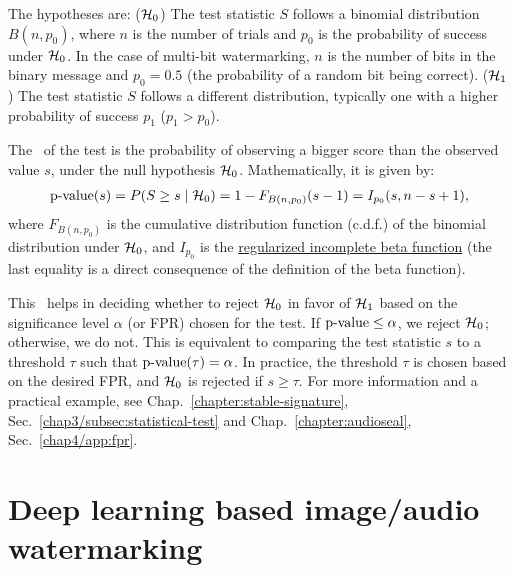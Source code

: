 The hypotheses are:
($\mathcal{H}_0$) The test statistic $S$ follows a binomial distribution $B(n, p_0)$, where $n$ is the number of trials and $p_0$ is the probability of success under $\mathcal{H}_0$.
In the case of multi-bit watermarking, $n$ is the number of bits in the binary message and $p_0 = 0.5$ (the probability of a random bit being correct).
($\mathcal{H}_1$) The test statistic $S$ follows a different distribution, typically one with a higher probability of success $p_1$ ($p_1 > p_0$).

The \pval\ of the test is the probability of observing a bigger score than the observed value $s$, under the null hypothesis $\mathcal{H}_0$. 
Mathematically, it is given by:
\begin{align}
    \text{p\textrm{-value}}(s) = P(S \geq s \mid \mathcal{H}_0) = 1 - F_{B(n, p_0)}(s-1) = I_{p_0}(s, n-s+1),
\end{align}
where $F_{B(n, p_0)}$ is the cumulative distribution function (c.d.f.) of the binomial distribution under $\mathcal{H}_0$, and $I_{p_0}$ is the \href{https://en.wikipedia.org/wiki/Beta_function#Incomplete_beta_function}{regularized incomplete beta function} (the last equality is a direct consequence of the definition of the beta function).

This \pval\ helps in deciding whether to reject $\mathcal{H}_0$ in favor of $\mathcal{H}_1$ based on the significance level $\alpha$ (or FPR) chosen for the test. 
If $\text{p\textrm{-value}} \leq \alpha$, we reject $\mathcal{H}_0$; otherwise, we do not.
This is equivalent to comparing the test statistic $s$ to a threshold $\tau$ such that $\text{p\textrm{-value}}(\tau) = \alpha$.
In practice, the threshold $\tau$ is chosen based on the desired FPR, and $\mathcal{H}_0$ is rejected if $s \geq \tau$.
For more information and a practical example, see Chap.~\ref{chapter:stable-signature}, Sec.~\ref{chap3/subsec:statistical-test} and Chap.~\ref{chapter:audioseal}, Sec.~\ref{chap4/app:fpr}.




















\section{Deep learning based image/audio watermarking}\label{chap0/sec:deep learning-watermarking}

